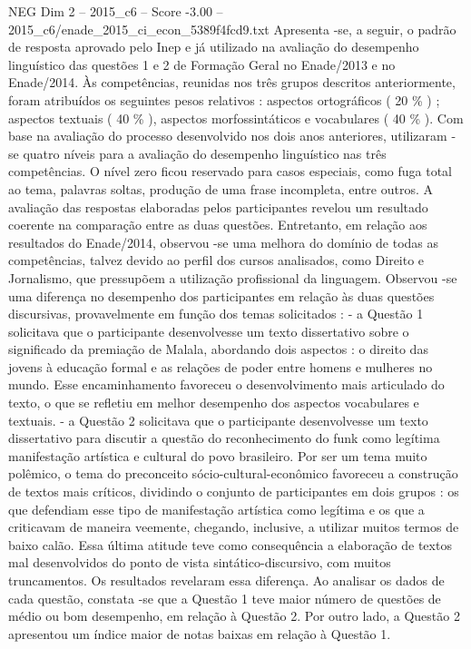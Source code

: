 \begin{textsample}{NEG Dim 2 – 2015\_c6 – Score -3.00 – 2015\_c6/enade\_2015\_ci\_econ\_5389f4fcd9.txt}
Apresenta -se, a seguir, o padrão de resposta aprovado pelo Inep e já utilizado na avaliação do desempenho linguístico das questões 1 e 2 de Formação Geral no Enade/2013 e no Enade/2014.
Às competências, reunidas nos três grupos descritos anteriormente, foram atribuídos os seguintes pesos relativos : aspectos ortográficos ( 20 \% ) ; aspectos textuais ( 40 \% ), aspectos morfossintáticos e vocabulares ( 40 \% ).
Com base na avaliação do processo desenvolvido nos dois anos anteriores, utilizaram -se quatro níveis para a avaliação do desempenho linguístico nas três competências.
O nível zero ficou reservado para casos especiais, como fuga total ao tema, palavras soltas, produção de uma frase incompleta, entre outros.
A avaliação das respostas elaboradas pelos participantes revelou um resultado coerente na comparação entre as duas questões.
Entretanto, em relação aos resultados do Enade/2014, observou -se uma melhora do domínio de todas as competências, talvez devido ao perfil dos cursos analisados, como Direito e Jornalismo, que pressupõem a utilização profissional da linguagem.
Observou -se uma diferença no desempenho dos participantes em relação às duas questões discursivas, provavelmente em função dos temas solicitados : - a Questão 1 solicitava que o participante desenvolvesse um texto dissertativo sobre o significado da premiação de Malala, abordando dois aspectos : o direito das jovens à educação formal e as relações de poder entre homens e mulheres no mundo.
Esse encaminhamento favoreceu o desenvolvimento mais articulado do texto, o que se refletiu em melhor desempenho dos aspectos vocabulares e textuais. - a Questão 2 solicitava que o participante desenvolvesse um texto dissertativo para discutir a questão do reconhecimento do funk como legítima manifestação artística e cultural do povo brasileiro.
Por ser um tema muito polêmico, o tema do preconceito sócio-cultural-econômico favoreceu a construção de textos mais críticos, dividindo o conjunto de participantes em dois grupos : os que defendiam esse tipo de manifestação artística como legítima e os que a criticavam de maneira veemente, chegando, inclusive, a utilizar muitos termos de baixo calão.
Essa última atitude teve como consequência a elaboração de textos mal desenvolvidos do ponto de vista sintático-discursivo, com muitos truncamentos.
Os resultados revelaram essa diferença.
Ao analisar os dados de cada questão, constata -se que a Questão 1 teve maior número de questões de médio ou bom desempenho, em relação à Questão 2.
Por outro lado, a Questão 2 apresentou um índice maior de notas baixas em relação à Questão 1.

\end{textsample}
